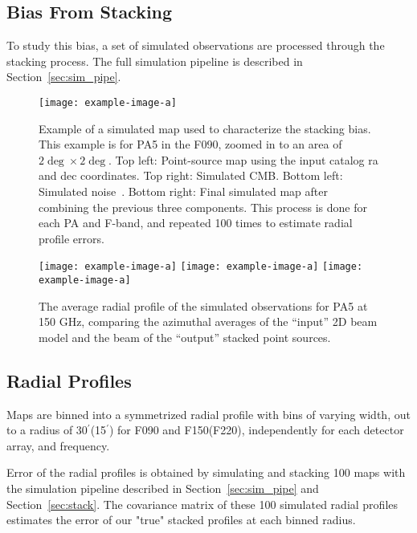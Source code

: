 \subsection{Bias From Stacking}
\label{subsec:tf}
To study this bias, a set of simulated observations are processed through the stacking process.  The full simulation pipeline is described in Section~\ref{sec:sim_pipe}.

\begin{figure*}[ht!]
    \centering
    \texttt{[image: example-image-a]}
    \caption{Example of a simulated map used to characterize the stacking bias.  This example is for PA5 in the F090, zoomed in to an area of $2\deg\times2\deg$.  Top left: Point-source map using the input catalog ra and dec coordinates.  Top right:  Simulated CMB.  Bottom left:  Simulated noise~\cite{atkins}.  Bottom right: Final simulated map after combining the previous three components.  This process is done for each PA and F-band, and repeated 100 times to estimate radial profile errors.
    }
    \label{fig:sim_map}
\end{figure*}

\begin{figure}
    \centering
    \texttt{[image: example-image-a]}
    \texttt{[image: example-image-a]}
    \texttt{[image: example-image-a]}
    \caption{The average radial profile of the simulated observations for PA5 at 150 GHz, comparing the azimuthal averages of the \enquote{input} 2D beam model and the beam of the \enquote{output} stacked point sources. 
    }
    \label{fig:profiles}
\end{figure}
\subsection{Radial Profiles}
\label{subsec:profs}

Maps are binned into a symmetrized radial profile with bins of varying width, out to a radius of 30$^{\prime}$(15$^{\prime}$) for F090 and F150(F220), independently for each detector array, and frequency.

Error of the radial profiles is obtained by simulating and stacking 100 maps with the simulation pipeline described in Section~\ref{sec:sim_pipe} and Section~\ref{sec:stack}.  The covariance matrix of these 100 simulated radial profiles estimates the error of our "true" stacked profiles at each binned radius.

